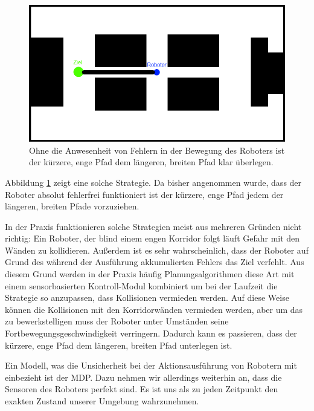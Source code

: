\documentclass[a4paper]{IEEEtran}
\begin{document}
\begin{figure}[ht]
	\centering
	\includegraphics[scale=0.42]{images/autnmRobot_directPath.png}
	\caption{Ohne die Anwesenheit von Fehlern in der Bewegung des Roboters ist der kürzere, enge Pfad dem längeren, breiten Pfad klar überlegen.}
	\label{fig:holoch_autnmRob_dirPath}
\end{figure}
Abbildung \ref{fig:holoch_autnmRob_dirPath} zeigt eine solche Strategie. Da bisher angenommen wurde, dass der Roboter absolut fehlerfrei funktioniert ist der kürzere, enge Pfad jedem der längeren, breiten Pfade vorzuziehen.

In der Praxis funktionieren solche Strategien meist aus mehreren Gründen nicht richtig: Ein Roboter, der blind einem engen Korridor folgt läuft Gefahr mit den Wänden zu kollidieren. Außerdem ist es sehr wahrscheinlich, dass der Roboter auf Grund des während der Ausführung akkumulierten Fehlers das Ziel verfehlt. Aus diesem Grund werden in der Praxis häufig Planungsalgorithmen diese Art mit einem sensorbasierten Kontroll-Modul kombiniert um bei der Laufzeit die Strategie so anzupassen, dass Kollisionen vermieden werden. Auf diese Weise können die Kollisionen mit den Korridorwänden vermieden werden, aber um das zu bewerkstelligen muss der Roboter unter Umständen seine Fortbewegungsgeschwindigkeit verringern. Dadurch kann es passieren, dass der kürzere, enge Pfad dem längeren, breiten Pfad unterlegen ist.

Ein Modell, was die Unsicherheit bei der Aktionsausführung von Robotern mit einbezieht ist der MDP. Dazu nehmen wir allerdings weiterhin an, dass die Sensoren des Roboters perfekt sind. Es ist uns als zu jeden Zeitpunkt den exakten Zustand unserer Umgebung wahrzunehmen.
\end{document}
